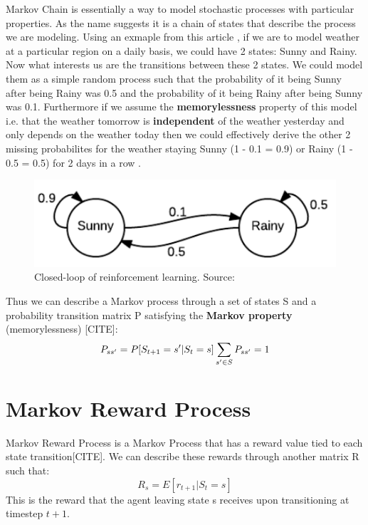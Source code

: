 Markov Chain is essentially a way to model stochastic processes with
particular properties. As the name suggests it is a chain of states
that describe the process we are modeling. Using an exmaple from this article \cite{markov_chain_article}, if we are to model weather at a particular region on a daily basis, we could have 2 states: Sunny and Rainy. Now what interests us are the transitions between these 2 states. We could model them as a simple random process such that the probability of it being Sunny after being Rainy was 0.5 and the probability of it being Rainy after being Sunny was 0.1. Furthermore if we assume the \textbf{memorylessness} property of this model i.e. that the weather tomorrow is \textbf{independent} of the weather yesterday and only depends on the weather today then we could effectively derive the other 2 missing probabilites for the weather staying Sunny (1 - 0.1 = 0.9) or Rainy (1 - 0.5 = 0.5) for 2 days in a row \cite{markov_chain_article}.

\begin{figure}[h!]
  \centering
  \includegraphics[scale=0.7]{figures/markov_weather.PNG}
  \caption{Closed-loop of reinforcement learning. Source: \cite{markov_chain_article}}
  \label{fig:weather}
\end{figure}

Thus we can describe a Markov process through a set of states S and a probability transition matrix P satisfying the \textbf{Markov property}
(memorylessness) [CITE]:
\begin{equation}
    P_{ss'} = P[S_{t+1} = s' | S_{t} = s]\\
    \sum_{s' \in S} P_{ss'} = 1
\end{equation}

\section{Markov Reward Process}
Markov Reward Process is a Markov Process that 
has a reward value tied to each state transition[CITE]. We can describe these rewards through another matrix R such that:
\begin{equation}
    R_{s} = E[r_{t+1} | S_{t} = s]
\end{equation}
This is the reward that the agent leaving state s receives upon transitioning at timestep $t+1$.\\

